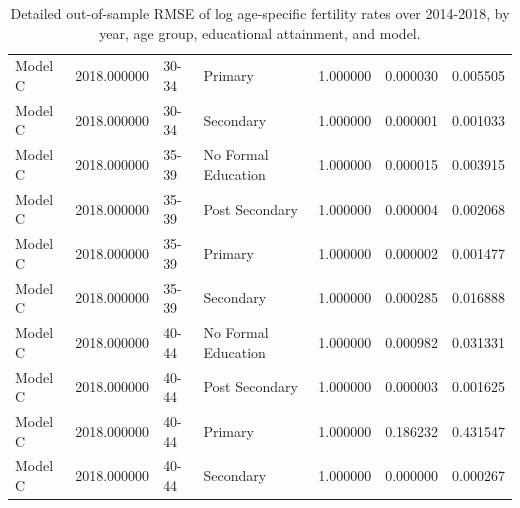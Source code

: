 \begin{table}[ht]
\begin{tabular}{lrllrrr}
Model C & 2018.000000 & 30-34 & Primary & 1.000000 & 0.000030 & 0.005505 \\
Model C & 2018.000000 & 30-34 & Secondary & 1.000000 & 0.000001 & 0.001033 \\
Model C & 2018.000000 & 35-39 & No Formal Education & 1.000000 & 0.000015 & 0.003915 \\
Model C & 2018.000000 & 35-39 & Post Secondary & 1.000000 & 0.000004 & 0.002068 \\
Model C & 2018.000000 & 35-39 & Primary & 1.000000 & 0.000002 & 0.001477 \\
Model C & 2018.000000 & 35-39 & Secondary & 1.000000 & 0.000285 & 0.016888 \\
Model C & 2018.000000 & 40-44 & No Formal Education & 1.000000 & 0.000982 & 0.031331 \\
Model C & 2018.000000 & 40-44 & Post Secondary & 1.000000 & 0.000003 & 0.001625 \\
Model C & 2018.000000 & 40-44 & Primary & 1.000000 & 0.186232 & 0.431547 \\
Model C & 2018.000000 & 40-44 & Secondary & 1.000000 & 0.000000 & 0.000267 \\
\hline
\end{tabular}
\caption{Detailed out-of-sample RMSE of log age-specific fertility rates over 2014-2018, by year, age group, educational attainment, and model.}
\label{tab:fertility_rmse_detailed}
\end{table}
